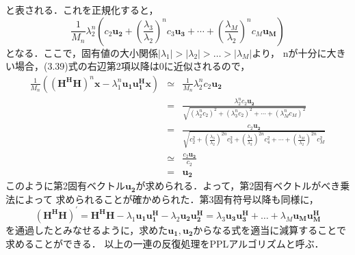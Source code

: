 と表される．これを正規化すると，
\begin{equation}
    \frac{1}{M_n}\lambda_2^n\left(
        c_2\bm{u_2} + \left(\frac{\lambda_3}{\lambda_2}\right)^nc_3\bm{u_3} + \cdots + \left(\frac{\lambda_M}{\lambda_2}\right)^nc_M\bm{u_M}
    \right)
\end{equation}
となる．ここで，固有値の大小関係$|\lambda_1|>|\lambda_2|>\ldots>|\lambda_M|$より，
nが十分に大きい場合，(3.39)式の右辺第2項以降は0に近似されるので，
\begin{eqnarray}
    \frac{1}{M_n}\left((\bm{H^HH})^n\bm{x}-\lambda_1^n\bm{u_1u_1^Hx}\right) &\simeq& \frac{1}{M_n}\lambda_2^nc_2\bm{u_2} \nonumber \\
    &=& \frac{\lambda_2^nc_2\bm{u_2}}{\sqrt{(\lambda_2^nc_2)^2+(\lambda_3^nc_2)^2+\cdots+(\lambda_M^nc_M)^2}} \nonumber \\
    &=& \frac{c_2\bm{u_2}}{\sqrt{c_2^2 + \left(\frac{\lambda_3}{\lambda_2}\right)^{2n}c_3^2+\left(\frac{\lambda_4}{\lambda_2}\right)^{2n}c_4^2+\cdots+\left(\frac{\lambda_M}{\lambda_2}\right)^{2n}c_M^2}} \nonumber \\
    &\simeq& \frac{c_2\bm{u_2}}{c_2} \nonumber \\
    &=& \bm{u_2}
\end{eqnarray}
このように第2固有ベクトル$\bm{u_2}$が求められる．よって，第2固有ベクトルがべき乗法によって
求められることが確かめられた．第3固有符号以降も同様に，
\begin{equation}
    (\bm{H^HH})^{\prime} = \bm{H^HH}-\lambda_1\bm{u_1u_1^H}-\lambda_2\bm{u_2u_2^H}=\lambda_3\bm{u_3u_3^H}+\ldots+\lambda_M\bm{u_Mu_M^H}
\end{equation}
を通過したとみなせるように，求めた$\bm{u_1,u_2}$からなる式を適当に減算することで求めることができる．
以上の一連の反復処理をPPLアルゴリズムと呼ぶ．